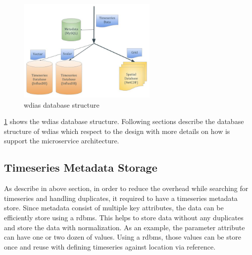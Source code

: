 \begin{figure}[htp]
    \centering
    \includegraphics[width=0.6\textwidth]{method/microservice/wdias_database_structure.jpg}
    \caption{\acrshort{wdias} database structure}
    \label{fi:database_structure}
\end{figure}


\cref{fi:database_structure} shows the \acrshort{wdias} database structure.
Following sections describe the database structure of \acrshort{wdias} which respect to the design with more details on how is support the microservice architecture.

\subsection{Timeseries Metadata Storage}
\label{subse:mysql}

As describe in above section, in order to reduce the overhead while searching for timeseries and handling duplicates, it required to have a timeseries metadata store. Since metadata consist of multiple key attributes, the data can be efficiently store using a \acrfull{rdbms}. This helps to store data without any duplicates and store the data with normalization. As an example, the parameter attribute can have one or two dozen of values. Using a \acrshort{rdbms}, those values can be store once and reuse with defining timeseries against location via reference.


